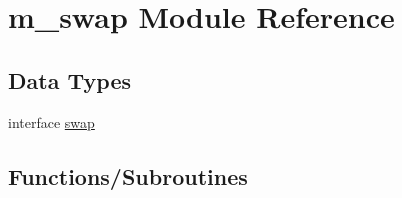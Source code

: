 \hypertarget{namespacem__swap}{}\section{m\+\_\+swap Module Reference}
\label{namespacem__swap}
\subsection*{Data Types}
\begin{DoxyCompactItemize}
\item 
interface \hyperlink{interfacem__swap_1_1swap}{swap}
\end{DoxyCompactItemize}
\subsection*{Functions/\+Subroutines}
